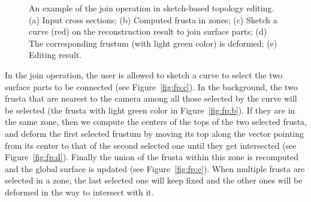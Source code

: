 \begin{figure} [htbp]
{\begin{minipage}[b]{0.18\textwidth}
    \end{minipage}}
  \caption{An example of the join operation in sketch-based topology editing.
  (a) Input cross sections;
  (b) Computed frusta in zones;
  (c) Sketch a curve (red) on the reconstruction result to join surface parts;
  (d) The corresponding frustum (with light green color) is deformed;
  (e) Editing result.}
  \label{fig:fp}
\end{figure}

In the join operation,  the user is allowed to sketch a curve to
select the two surface parts to be connected (see
Figure~\ref{fig:fp:c}). In the background, the two frusta that are
nearest to the camera among all those selected by the curve will be
selected (the frusta with light green color in
Figure~\ref{fig:fp:b}). If they are in the same zone, then we
compute the centers of the tops of the two selected frusta, and
deform the first selected frustum by moving its top along the vector
pointing from its center to that of the second selected one until
they get intersected (see Figure~\ref{fig:fp:d}). Finally the union
of the frusta within this zone is recomputed and the global surface
is updated (see Figure~\ref{fig:fp:e}). When multiple frusta are
selected in a zone, the last selected one will keep fixed and the
other ones will be deformed in the way to intersect with it.

